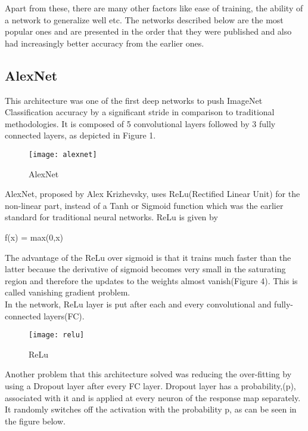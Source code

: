 \documentclass[../main.tex]{subfiles}
\begin{document}
Apart from these, there are many other factors like ease of training, the ability of a network to generalize well etc. The networks described below are the most popular ones and are presented in the order that they were published and also had increasingly better accuracy from the earlier ones.

\subsection{AlexNet}
This architecture was one of the first deep networks to push ImageNet Classification accuracy by a significant stride in comparison to traditional methodologies. It is composed of 5 convolutional layers followed by 3 fully connected layers, as depicted in Figure 1.
\begin{figure}[htbp] 
\centering 
\texttt{[image: alexnet]}
\caption{AlexNet} 
\label{alexnet} 
\end{figure} 

AlexNet, proposed by Alex Krizhevsky, uses ReLu(Rectified Linear Unit) for the non-linear part, instead of a Tanh or Sigmoid function which was the earlier standard for traditional neural networks. ReLu is given by 

f(x) = max(0,x)

The advantage of the ReLu over sigmoid is that it trains much faster than the latter because the derivative of sigmoid becomes very small in the saturating region and therefore the updates to the weights almost vanish(Figure 4). This is called vanishing gradient problem.\\
In the network, ReLu layer is put after each and every convolutional and fully-connected layers(FC).

\begin{figure}[htbp] 
\centering 
\texttt{[image: relu]}
\caption{ReLu} 
\label{relu} 
\end{figure}
Another problem that this architecture solved was reducing the over-fitting by using a Dropout layer after every FC layer. Dropout layer has a probability,(p), associated with it and is applied at every neuron of the response map separately. It randomly switches off the activation with the probability p, as can be seen in the figure below.  
\end{document}
